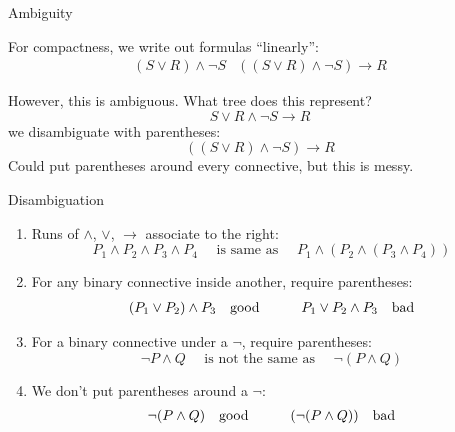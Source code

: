 \documentclass[xetex,aspectratio=169,14pt,hyperref={pdfpagelabels=true,pdflang={en-GB}}]{beamer}
\begin{document}
\begin{frame}
  {Ambiguity}

  For compactness, we write out formulas ``linearly'':
  \begin{displaymath}
    \begin{array}{ll}
      (S \lor R) \land \lnot S &
      ((S \lor R) \land \lnot S) \to R
    \end{array}
  \end{displaymath}

  \medskip

  However, this is ambiguous. What tree does this represent?
  \begin{displaymath}
    S \lor R \land \lnot S \to R
  \end{displaymath}
  we disambiguate with parentheses:
  \begin{displaymath}
    ((S \lor R) \land \lnot S) \to R
  \end{displaymath}
  Could put parentheses around every connective, but this is messy.
\end{frame}

\begin{frame}
  {Disambiguation}
  \begin{enumerate}
  \item Runs of $\land$, $\lor$, $\to$ associate to the right:
    \begin{displaymath}
      P_1 \land P_2 \land P_3 \land P_4 \quad \textrm{ is same as }\quad P_1 \land (P_2 \land (P_3 \land P_4))
    \end{displaymath}
  \item For any binary connective inside another, require parentheses:
    \begin{displaymath}
      \begin{array}{ll@{\hspace{3em}}ll}
        (P_1 \lor P_2) \land P_3&\textrm{good} &
        P_1 \lor P_2 \land P_3&\textrm{bad}
      \end{array}
    \end{displaymath}
  \item For a binary connective under a $\lnot$, require parentheses:
    \begin{displaymath}
        \lnot P \land Q \quad \textrm{ is not the same as } \quad \lnot (P \land Q)
    \end{displaymath}
  \item We don't put parentheses around a $\lnot$:
    \begin{displaymath}
      \begin{array}{ll@{\hspace{3em}}ll}
        \lnot (P \land Q) &\textrm{good} &
        (\lnot (P \land Q)) &\textrm{bad}
      \end{array}
    \end{displaymath}
  \end{enumerate}

\end{frame}
\end{document}
